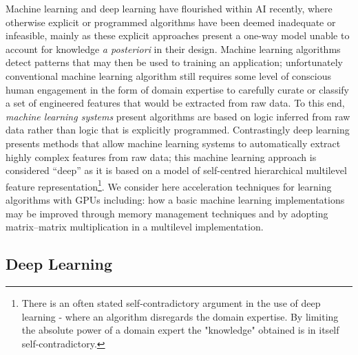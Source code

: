\documentclass[7pt]{article}
\begin{document}
Machine learning and deep learning have flourished within AI recently, where otherwise explicit or programmed algorithms have been deemed inadequate or infeasible, mainly as these explicit approaches present a one-way model unable to account for knowledge \emph{a posteriori} in their design. Machine learning algorithms detect patterns that may then be used to training an application; unfortunately conventional machine learning algorithm still requires some level of conscious human engagement in the form  of domain expertise to carefully curate or classify a set of engineered features that would be extracted from raw data. To this end, \emph{machine learning systems} present algorithms are based on logic  inferred from raw data rather than logic that is explicitly programmed.  Contrastingly deep learning presents methods that allow machine learning systems to automatically extract highly complex  features from raw data; this machine learning approach is considered “deep” as it is based on a model of self-centred hierarchical multilevel feature representation\footnote{There is an often stated self-contradictory argument in the use of deep learning - where an algorithm disregards the domain expertise. By limiting the absolute power of a domain expert the "knowledge" obtained is in itself self-contradictory.}. We consider here acceleration techniques for learning algorithms with GPUs including: how a basic machine learning implementations may be improved through memory management techniques and by adopting matrix–matrix multiplication in a multilevel implementation.

 \subsection{Deep Learning}
\end{document}
